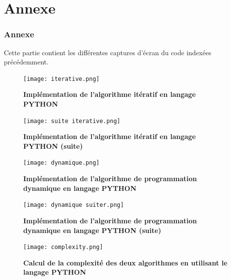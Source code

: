 \documentclass[12pt, openany]{report}
\begin{document}
\part{Annexe}
\newpage
\setlength{\parindent}{1cm}\section{Annexe}
Cette partie contient les différentes captures d'écran du code indexées précédemment.
\begin{figure}[h]
	\begin{center}
		\centering
		\texttt{[image: iterative.png]}~\\[0.1mm]
	\end{center}
	\caption{\textbf{Implémentation de l'algorithme itératif en langage    PYTHON}}
	\label{Graphe}
\end{figure} 
\begin{figure}[h]
	\begin{center}
		\centering
		\texttt{[image: suite iterative.png]}~\\[0.1mm]
	\end{center}
	\caption{\textbf{Implémentation de l'algorithme itératif en langage    PYTHON (suite)}}
	\label{Graphe}
\end{figure} 
\begin{figure}[h]
	\begin{center}
		\centering
		\texttt{[image: dynamique.png]}~\\[0.1mm]
	\end{center}
	\caption{\textbf{Implémentation de l'algorithme de programmation dynamique en langage    PYTHON}}
	\label{Graphe}
\end{figure} 
\begin{figure}[h]
	\begin{center}
		\centering
		\texttt{[image: dynamique suiter.png]}~\\[0.1mm]
	\end{center}
	\caption{\textbf{Implémentation de l'algorithme de programmation dynamique en langage PYTHON (suite)}}
	\label{Graphe}
\end{figure}
\begin{figure}[h]
	\begin{center}
		\centering
		\texttt{[image: complexity.png]}~\\[0.1mm]
	\end{center}
	\caption{\textbf{Calcul de la complexité des deux algorithmes en utilisant le langage PYTHON}}
	\label{Graphe}
\end{figure}
\end{document}
